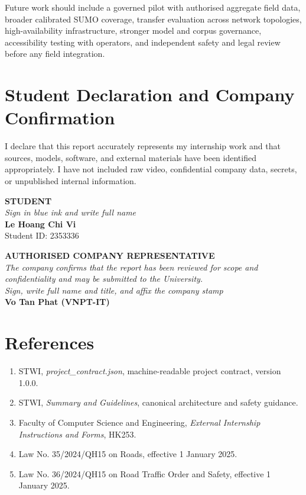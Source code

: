 \documentclass[12pt,a4paper]{report}
\newcommand{\enterpriseMentor}{Vo Tan Phat (VNPT-IT)}
\begin{document}
Future work should include a governed pilot with authorised aggregate field data, broader calibrated SUMO coverage, transfer evaluation across network topologies, high-availability infrastructure, stronger model and corpus governance, accessibility testing with operators, and independent safety and legal review before any field integration.

\chapter*{Student Declaration and Company Confirmation}

I declare that this report accurately represents my internship work and that sources, models, software, and external materials have been identified appropriately. I have not included raw video, confidential company data, secrets, or unpublished internal information.

\vspace{0.8cm}
\noindent
\begin{minipage}[t]{0.46\textwidth}
\centering
\textbf{STUDENT}\\[0.1cm]
\textit{Sign in blue ink and write full name}\\[2.7cm]
\textbf{Le Hoang Chi Vi}\\
Student ID: 2353336
\end{minipage}
\hfill
\begin{minipage}[t]{0.46\textwidth}
\centering
\textbf{AUTHORISED COMPANY REPRESENTATIVE}\\[0.1cm]
\textit{The company confirms that the report has been reviewed for scope and confidentiality and may be submitted to the University.}\\[0.2cm]
\textit{Sign, write full name and title, and affix the company stamp}\\[2.7cm]
\textbf{\enterpriseMentor}
\end{minipage}

\chapter*{References}

\begin{enumerate}[leftmargin=1.2cm]
  \item STWI, \textit{project\_contract.json}, machine-readable project contract, version 1.0.0.
  \item STWI, \textit{Summary and Guidelines}, canonical architecture and safety guidance.
  \item Faculty of Computer Science and Engineering, \textit{External Internship Instructions and Forms}, HK253.
  \item Law No. 35/2024/QH15 on Roads, effective 1 January 2025.
  \item Law No. 36/2024/QH15 on Road Traffic Order and Safety, effective 1 January 2025.
\end{enumerate}
\end{document}
